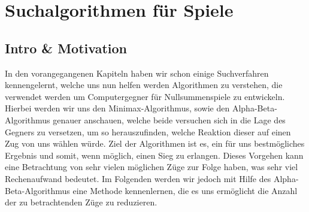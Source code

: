
\chapter{Suchalgorithmen für Spiele}

\usetikzlibrary{arrows}
\usetikzlibrary{calc}
\usetikzlibrary{positioning}
\usetikzlibrary{matrix}


\newsavebox\mybox
\savebox{}



\section{Intro \& Motivation}

In den vorangegangenen Kapiteln haben wir schon einige Suchverfahren kennengelernt, welche uns nun helfen werden Algorithmen zu verstehen, die verwendet werden um Computergegner für Nullsummenspiele zu entwickeln. Hierbei werden wir uns den Minimax-Algorithmus, sowie den Alpha-Beta-Algorithmus genauer anschauen, welche beide versuchen sich in die Lage des Gegners zu versetzen, um so  herauszufinden, welche Reaktion dieser auf einen Zug von uns wählen würde. Ziel der Algorithmen ist es, ein für uns bestmögliches Ergebnis und somit, wenn möglich, einen Sieg zu erlangen. Dieses Vorgehen kann eine Betrachtung von sehr vielen möglichen Züge zur Folge haben, was sehr viel Rechenaufwand bedeutet. Im Folgenden werden wir jedoch  mit Hilfe des Alpha-Beta-Algorithmus eine Methode kennenlernen, die es uns ermöglicht die Anzahl der zu betrachtenden Züge zu reduzieren.



